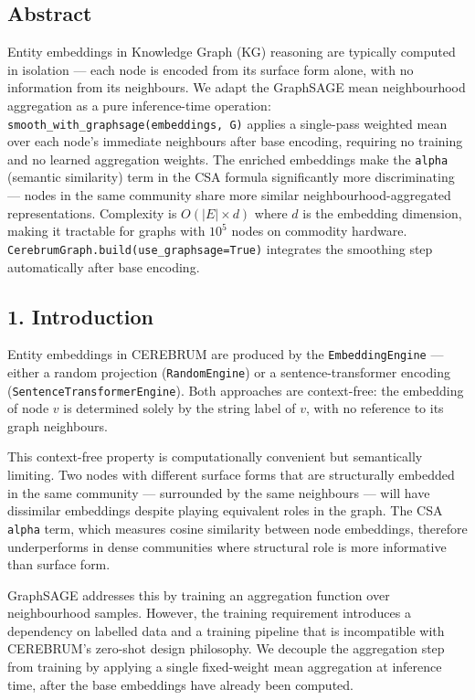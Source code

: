 
\subsection*{Abstract}
Entity embeddings in Knowledge Graph (KG) reasoning are typically computed in isolation --- each node is encoded from its surface form alone, with no information from its neighbours. We adapt the GraphSAGE \cite{hamilton2017graphsage} mean neighbourhood aggregation as a pure inference-time operation: \texttt{smooth\_with\_graphsage(embeddings, G)} applies a single-pass weighted mean over each node's immediate neighbours after base encoding, requiring no training and no learned aggregation weights. The enriched embeddings make the \texttt{alpha} (semantic similarity) term in the CSA formula \cite{vaswani2017attention} significantly more discriminating --- nodes in the same community share more similar neighbourhood-aggregated representations. Complexity is $O(|E| \times d)$ where $d$ is the embedding dimension, making it tractable for graphs with $10^5$ nodes on commodity hardware. \texttt{CerebrumGraph.build(use\_graphsage=True)} integrates the smoothing step automatically after base encoding.

\subsection*{1. Introduction}
Entity embeddings in CEREBRUM are produced by the \texttt{EmbeddingEngine} --- either a random projection (\texttt{RandomEngine}) or a sentence-transformer encoding (\texttt{SentenceTransformerEngine}). Both approaches are context-free: the embedding of node $v$ is determined solely by the string label of $v$, with no reference to its graph neighbours.

This context-free property is computationally convenient but semantically limiting. Two nodes with different surface forms that are structurally embedded in the same community --- surrounded by the same neighbours --- will have dissimilar embeddings despite playing equivalent roles in the graph. The CSA \texttt{alpha} term, which measures cosine similarity between node embeddings, therefore underperforms in dense communities where structural role is more informative than surface form.

GraphSAGE \cite{hamilton2017graphsage} addresses this by training an aggregation function over neighbourhood samples. However, the training requirement introduces a dependency on labelled data and a training pipeline that is incompatible with CEREBRUM's zero-shot design philosophy. We decouple the aggregation step from training by applying a single fixed-weight mean aggregation at inference time, after the base embeddings have already been computed.


